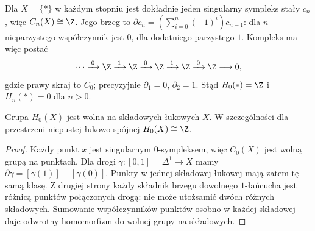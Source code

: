 \begin{przyklad}[Punkt]
\label{prz:homologia-punktu}
Dla $X=\{*\}$ w każdym stopniu jest
dokładnie jeden singularny sympleks
stały $c_n$, więc $C_n(X)\cong\Z$.
Jego brzeg to
$\partial c_n=(\sum_{i=0}^n(-1)^i)c_{n-1}$:
dla $n$ nieparzystego współczynnik
jest $0$, dla dodatniego parzystego $1$.
Kompleks ma więc postać
\[
 \cdots\xrightarrow{\;0\;}\Z
 \xrightarrow{\;1\;}\Z
 \xrightarrow{\;0\;}\Z
 \xrightarrow{\;1\;}\Z
 \xrightarrow{\;0\;}\Z\longrightarrow0,
\]
gdzie prawy skraj to $C_0$; precyzyjnie
$\partial_1=0$, $\partial_2=1$.
Stąd $H_0(*)=\Z$ i $H_n(*)=0$ dla $n>0$.
\end{przyklad}

\begin{stwierdzenie}
\label{prop:h0-singularne}
Grupa $H_0(X)$ jest wolna na składowych
łukowych $X$. W szczególności
dla przestrzeni niepustej łukowo spójnej
$H_0(X)\cong\Z$.
\end{stwierdzenie}
\begin{proof}
Każdy punkt $x$ jest singularnym
$0$-sympleksem, więc $C_0(X)$
jest wolną grupą na punktach.
Dla drogi $\gamma:[0,1]=\Delta^1\to X$
mamy $\partial\gamma=[\gamma(1)]-
[\gamma(0)]$. Punkty w jednej składowej
łukowej mają zatem tę samą klasę.
Z drugiej strony każdy składnik
brzegu dowolnego $1$-łańcucha
jest różnicą punktów połączonych drogą:
nie może utożsamić dwóch różnych
składowych. Sumowanie współczynników
punktów osobno w każdej składowej
daje odwrotny homomorfizm do
wolnej grupy na składowych.
\end{proof}

